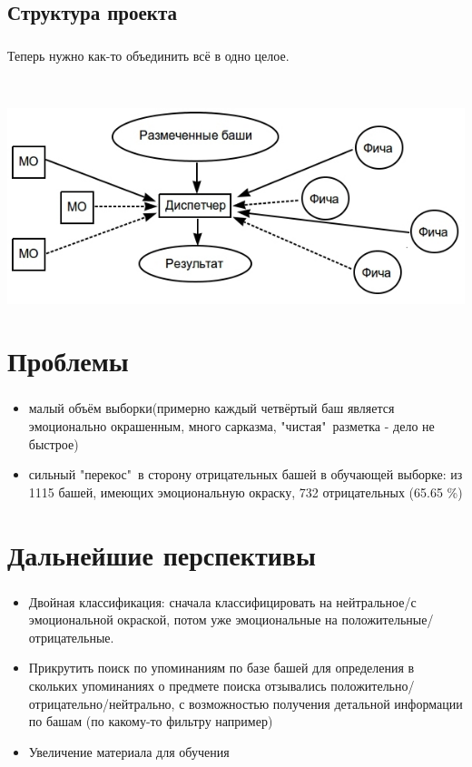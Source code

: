 \documentclass[t]{beamer}
\begin{document}
	\subsection{Структура проекта}
	\begin{frame}
		\frametitle{\insertsection}
		\framesubtitle{\insertsubsection}
		{Теперь нужно как-то объединить всё в одно целое.}\pause
		
		
		~
		
		\includegraphics[scale=0.52]{images/TheManager.jpg}
	\end{frame}	
	
	
	\section{Проблемы}
	
	\begin{frame}
		\frametitle{\insertsection}
		\begin{itemize}
			\item{малый объём выборки(примерно каждый четвёртый баш является эмоционально окрашенным, много сарказма, "чистая"\ разметка - дело не быстрое)}
			\item{сильный "перекос"\ в сторону отрицательных башей в обучающей выборке: из 1115 башей, имеющих эмоциональную окраску, 732 отрицательных (65.65 \%)}
		\end{itemize}
	\end{frame}

	\section{Дальнейшие перспективы}
	\begin{frame}
		\frametitle{\insertsection}
		\begin{itemize}
			\item
			Двойная классификация: сначала классифицировать на нейтральное/с эмоциональной окраской, потом уже эмоциональные на положительные/отрицательные. 
			\item
			Прикрутить поиск по упоминаниям по базе башей для определения в скольких упоминаниях о предмете поиска отзывались положительно/отрицательно/нейтрально, с возможностью получения детальной информации по башам (по какому-то фильтру например)
			\item
			Увеличение материала для обучения 
			
		\end{itemize}
		
	\end{frame}
		
\end{document}
